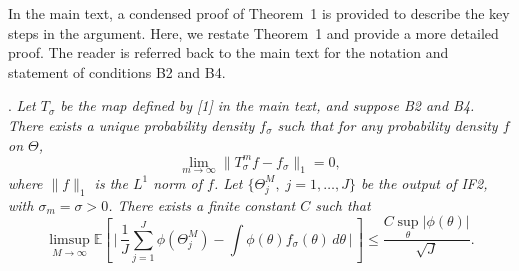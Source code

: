 \documentclass[11pt]{article}
\newcommand\Ca{C}
\begin{document}
In the main text, a condensed proof of Theorem~1 is provided to describe the key steps in the argument. 
Here, we restate Theorem~1 and provide a more detailed proof.
The reader is referred back to the main text for the notation and statement of conditions B2 and B4. 

\medskip

. 
{\it
Let $T_\sigma$ be the map defined by [1] in the main text, and suppose B2 and B4. There exists a unique probability density $f_\sigma$ such that for any probability density $f$ on $\Theta$,
\begin{equation}
\label{eq:sup:thm1.1}
\lim_{m\to\infty} \|T_\sigma^m f - f_\sigma\|_1=0,
\end{equation}
where $\|f\|_1$ is the $L^1$ norm of $f$.  Let $\{\Theta_j^M,\;j=1,\ldots,J\}$ be the output of IF2, with $\sigma_m=\sigma>0$. There exists a finite constant $\Ca$ such that 
\begin{equation}
\label{eq:sup:thm1.2}
\limsup_{M\to\infty}\mathbb{E}\left[\,\bigg|\,\frac{1}{J}\sum_{j=1}^J \phi(\Theta_j^M)- \int \phi(\theta)f_\sigma(\theta)\, d\theta\,\bigg|\,\right] \leq \frac{\Ca \sup_\theta|\phi(\theta)|}{\sqrt{J}}.
\end{equation}
}
\end{document}
